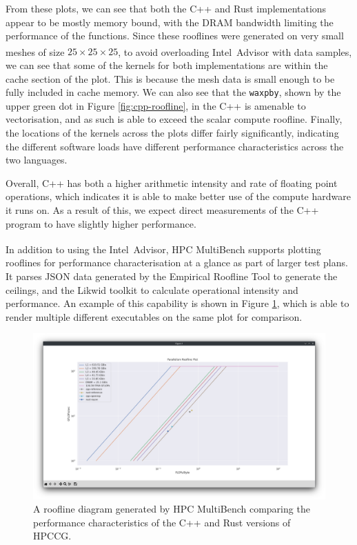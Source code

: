 From these plots, we can see that both the C++ and Rust implementations appear to be mostly memory bound, with the DRAM bandwidth limiting the performance of the functions. Since these rooflines were generated on very small meshes of size $25 \times 25 \times 25$, to avoid overloading Intel\textsuperscript{\textregistered}\ Advisor with data samples, we can see that some of the kernels for both implementations are within the cache section of the plot. This is because the mesh data is small enough to be fully included in cache memory. We can also see that the \texttt{waxpby}, shown by the upper green dot in Figure \ref{fig:cpp-roofline}, in the C++ is amenable to vectorisation, and as such is able to exceed the scalar compute roofline. Finally, the locations of the kernels across the plots differ fairly significantly, indicating the different software loads have different performance characteristics across the two languages.

Overall, C++ has both a higher arithmetic intensity and rate of floating point operations, which indicates it is able to make better use of the compute hardware it runs on. As a result of this, we expect direct measurements of the C++ program to have slightly higher performance.

In addition to using the Intel\textsuperscript{\textregistered}\ Advisor, HPC MultiBench supports plotting rooflines for performance characterisation at a glance as part of larger test plans. It parses JSON data generated by the Empirical Roofline Tool \cite{EmpiricalRooflineTool} to generate the ceilings, and the Likwid toolkit \cite{RRZEHPCLikwid2024} to calculate operational intensity and performance. An example of this capability is shown in Figure \ref{fig:hpc-multibench-roofline}, which is able to render multiple different executables on the same plot for comparison.

\begin{figure}[H]
    \centering
    \includegraphics[width=\textwidth]{images/4_tooling/interactive_screenshots/hpc-multibench-roofline-matplotlib.png}
    \caption{A roofline diagram generated by HPC MultiBench comparing the performance characteristics of the C++ and Rust versions of HPCCG.}
    \label{fig:hpc-multibench-roofline}
\end{figure}

